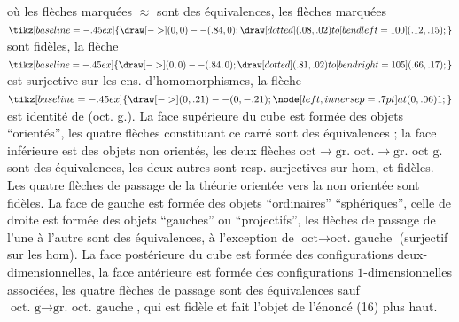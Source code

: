 %
où les flèches marquées $\approx$ sont des équivalences,
les flèches marquées $\mathrel{\tikz[baseline=-.45ex]{\draw[->] (0,0)--(.84,0); \draw[dotted] (.08,.02) to[bend left=100] (.12,.15);}}$ sont fidèles, la
flèche $\mathrel{\tikz[baseline=-.45ex]{\draw[->] (0,0)--(.84,0); \draw[dotted] (.81,.02) to[bend right=105] (.66,.17);}}$ est surjective sur les ens. d'homomorphismes,
la flèche  $\mathrel{\tikz[baseline=-.45ex]{\draw[->] (0,.21)--(0,-.21); \node[left,inner sep=.7pt] at (0,.06) {\scriptsize 1};}}$ est 
identité de (oct. g.). La face supérieure du
cube est formée des objets ``orientés'', les quatre
flèches constituant ce carré sont des équivalences ;
la face inférieure est  des objets
non orientés,  les deux flèches
$\textrm{oct}\longrightarrow\textrm{gr. oct.}\longrightarrow\textrm{gr. oct g.}$ sont des équivalences,
les deux autres sont resp. surjectives sur  hom,
et fidèles. Les quatre flèches de passage
de la théorie orientée vers la non orientée sont
fidèles. La face de gauche est formée des
objets ``ordinaires''  ``sphériques'', celle de
droite est formée des objets ``gauches'' ou
``projectifs'', les  flèches de passage de l'une
à l'autre sont des équivalences, à l'exception
de $\textrm{oct}\longrightarrow\textrm{oct. gauche}$ (surjectif sur les
hom). La face postérieure du cube est
formée des configurations deux-dimensionnelles,
 la face antérieure est formée des
configurations $1$-dimensionnelles associées, les
quatre flèches de passage sont des équivalences
sauf $\textrm{oct. g}\longrightarrow\textrm{gr. oct. gauche}$, qui est fidèle
et fait l'objet de l'énoncé (16) plus haut.
